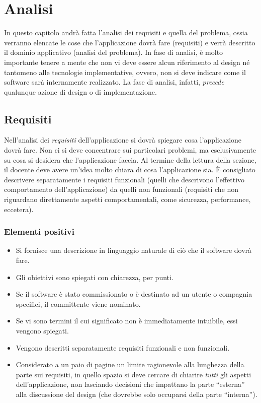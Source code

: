 \documentclass[a4paper,12pt]{report}
\begin{document}
\tableofcontents

\chapter{Analisi}

In questo capitolo andrà fatta l'analisi dei requisiti e quella del problema, ossia verranno elencate le cose che l'applicazione dovrà fare (requisiti) e verrà descritto il dominio applicativo (analisi del problema).
%
In fase di analisi, è molto importante tenere a mente che non vi deve essere alcun riferimento al design né tantomeno alle tecnologie implementative, ovvero, non si deve indicare come il software sarà internamente realizzato.
%
La fase di analisi, infatti, \textit{precede} qualunque azione di design o di implementazione.

\section{Requisiti}

Nell'analisi dei \emph{requisiti} dell'applicazione si dovrà spiegare cosa l'applicazione dovrà fare.
%
Non ci si deve concentrare sui particolari problemi, ma esclusivamente su cosa si desidera che l'applicazione faccia.
%
Al termine della lettura della sezione,
il docente deve avere un'idea molto chiara di cosa l'applicazione sia.
%
È consigliato descrivere separatamente i requisiti funzionali (quelli che descrivono l'effettivo
comportamento dell'applicazione) da quelli non funzionali (requisiti che non riguardano direttamente
aspetti comportamentali, come sicurezza, performance, eccetera).

\subsection*{Elementi positivi}
\begin{itemize}
	\item Si fornisce una descrizione in linguaggio naturale di ciò che il software dovrà fare.
	\item Gli obiettivi sono spiegati con chiarezza, per punti.
	\item Se il software è stato commissionato o è destinato ad un utente o compagnia specifici, il committente viene nominato.
	\item Se vi sono termini il cui significato non è immediatamente intuibile, essi vengono spiegati.
	\item Vengono descritti separatamente requisiti funzionali e non funzionali.
	\item Considerato a un paio di pagine un limite ragionevole alla lunghezza della parte sui requisiti, in quello spazio si deve cercare di chiarire \textit{tutti} gli aspetti dell'applicazione, non lasciando decisioni che impattano la parte ``esterna'' alla discussione del design (che dovrebbe solo occuparsi della parte ``interna'').
\end{itemize}
\end{document}
